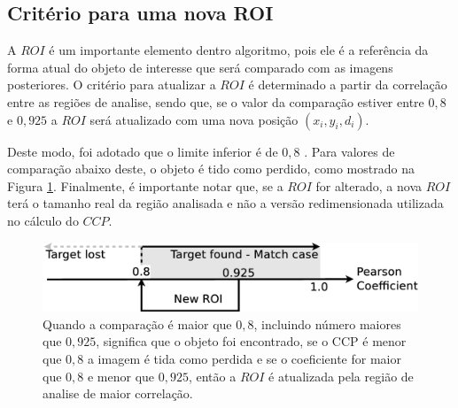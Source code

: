 \subsection{Critério para uma nova ROI}

A $ROI$ é um importante elemento dentro algoritmo, pois ele é a referência da
forma atual do objeto de interesse que será comparado com as imagens posteriores.
O critério para atualizar a $ROI$ é determinado a partir da correlação 
entre as regiões de analise, sendo que, se o valor da comparação estiver entre $0,8$ 
e $0,925$ a $ROI$ será atualizado com uma nova posição $(x_i,y_i,d_i)$.

Deste modo, foi adotado que o limite inferior é de $0,8$ \cite{Eugene}. Para valores
de comparação abaixo deste, o objeto é tido como perdido, como mostrado na Figura
\ref{fig:newroicri}.
Finalmente, é importante notar que, se a $ROI$ for alterado, a nova $ROI$ terá 
o tamanho real da região analisada e não a versão redimensionada utilizada no cálculo do $CCP$.


\begin{figure}[H]
\includegraphics[width=\columnwidth]{images/figure3.eps}
\caption{Quando a comparação é maior que $0,8$, incluindo número maiores que $0,925$, 
significa que o objeto foi encontrado,
se o CCP é menor que $0,8$ a imagem é tida como perdida e se o coeficiente for maior que $0,8$ 
e menor que $0,925$, então a $ROI$ é atualizada pela região de analise de 
maior correlação.}
\label{fig:newroicri}
\end{figure}

